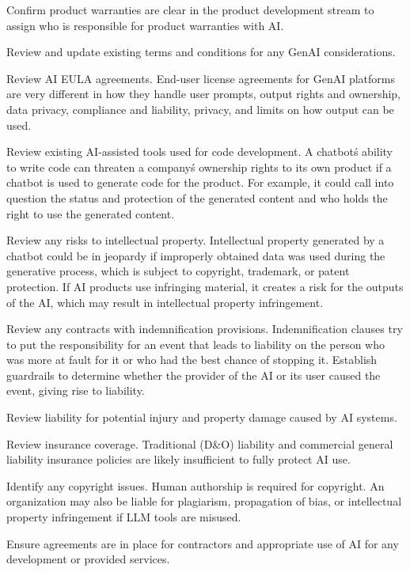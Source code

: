 \begin{minipage}{\linewidth}
\begin{checklist}
  \item Confirm product warranties are clear in the product development stream to assign who is responsible for product warranties with AI.
  \item Review and update existing terms and conditions for any GenAI considerations.
  \item Review AI EULA agreements. End-user license agreements for GenAI platforms are very different in how they handle user prompts, output rights and ownership, data privacy, compliance and liability, privacy, and limits on how output can be used.
  \item Review existing AI-assisted tools used for code development. A chatbot\'s ability to write code can threaten a company\'s ownership rights to its own product if a chatbot is used to generate code for the product. For example, it could call into question the status and protection of the generated content and who holds the right to use the generated content.
  \item Review any risks to intellectual property. Intellectual property generated by a chatbot could be in jeopardy if improperly obtained data was used during the generative process, which is subject to copyright, trademark, or patent protection. If AI products use infringing material, it creates a risk for the outputs of the AI, which may result in intellectual property infringement.
  \item Review any contracts with indemnification provisions. Indemnification clauses try to put the responsibility for an event that leads to liability on the person who was more at fault for it or who had the best chance of stopping it. Establish guardrails to determine whether the provider of the AI or its user caused the event, giving rise to liability.
  \item Review liability for potential injury and property damage caused by AI systems.
  \item Review insurance coverage. Traditional (D\&O) liability and commercial general liability insurance policies are likely insufficient to fully protect AI use.
  \item Identify any copyright issues. Human authorship is required for copyright. An organization may also be liable for plagiarism, propagation of bias, or intellectual property infringement if LLM tools are misused.
  \item Ensure agreements are in place for contractors and appropriate use of AI for any development or provided services.

\end{checklist}
\end{minipage}
